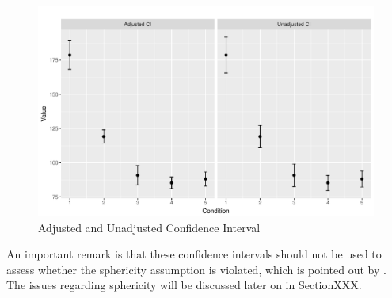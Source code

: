 \documentclass[11pt]{article}
\begin{document}
		\begin{figure}[htb]
			\begin{center}
				\includegraphics[scale=0.6]{CIs}
				\caption{Adjusted and Unadjusted Confidence Interval}
			\end{center}
		\end{figure}
		
		An important remark is that these confidence intervals should not be used to assess whether the sphericity assumption is violated, which is pointed out by \cite{franz2012standard}. The issues regarding sphericity will be discussed later on in SectionXXX.
		
\end{document}
